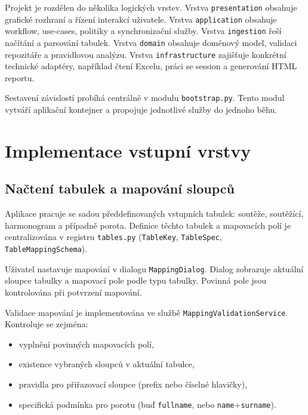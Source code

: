\documentclass[czech, kiv, ba, he, iso690alph, pdf]{fasthesis}
\begin{document}
			Projekt je rozdělen do několika logických vrstev. Vrstva \texttt{presentation} obsahuje grafické rozhraní a řízení interakcí uživatele. Vrstva \texttt{application} obsahuje workflow, use-cases, politiky a synchronizační služby. Vrstva \texttt{ingestion} řeší načítání a parsování tabulek. Vrstva \texttt{domain} obsahuje doménový model, validaci repozitáře a pravidlovou analýzu. Vrstva \texttt{infrastructure} zajišťuje konkrétní technické adaptéry, například čtení Excelu, práci se session a generování HTML reportu.
	
			Sestavení závislostí probíhá centrálně v modulu \texttt{bootstrap.py}. Tento modul vytváří aplikační kontejner a propojuje jednotlivé služby do jednoho běhu.
	
		\section{Implementace vstupní vrstvy}
		
			\subsection{Načtení tabulek a mapování sloupců}
				Aplikace pracuje se sadou předdefinovaných vstupních tabulek: soutěže, soutěžící, harmonogram a případně porota. Definice těchto tabulek a mapovacích polí je centralizována v registru \texttt{tables.py} (\texttt{TableKey}, \texttt{TableSpec}, \texttt{TableMappingSchema}).
	
				Uživatel nastavuje mapování v dialogu \texttt{MappingDialog}. Dialog zobrazuje aktuální sloupce tabulky a mapovací pole podle typu tabulky. Povinná pole jsou kontrolována při potvrzení mapování.
	
				Validace mapování je implementována ve službě \texttt{MappingValidationService}. Kontroluje se zejména:
				\begin{itemize}
					\item vyplnění povinných mapovacích polí,
					\item existence vybraných sloupců v aktuální tabulce,
					\item pravidla pro přiřazovací sloupce (prefix nebo číselné hlavičky),
					\item specifická podmínka pro porotu (buď \texttt{fullname}, nebo \texttt{name}+\texttt{surname}).
				\end{itemize}
	
\end{document}
